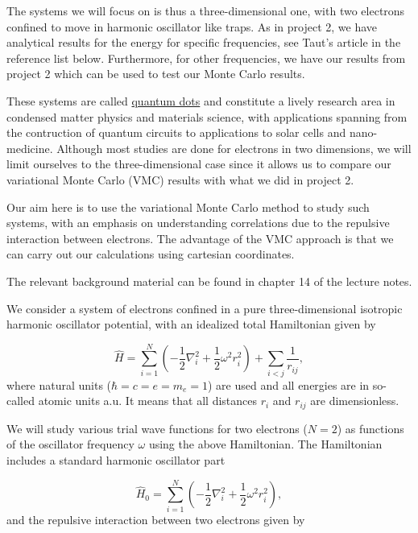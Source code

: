 \documentclass[%
oneside,                 %
final,                   %
10pt]{article}
\begin{document}
The systems we will focus on is thus  a three-dimensional one, with two electrons
confined to move in harmonic oscillator like traps. As in project 2, we have analytical
results for the energy for specific frequencies, see Taut's article in the reference list below.
Furthermore, for other frequencies, we have our results from project 2
which can be used to test our Monte Carlo results. 

These systems are called \href{{http://en.wikipedia.org/wiki/Quantum_dot}}{quantum dots} and constitute a lively research
area in condensed matter physics and materials science, with
applications spanning from the contruction of quantum circuits to
applications to solar cells and nano-medicine. Although most studies are done for electrons in two dimensions,
we will limit ourselves to the three-dimensional case since it allows us to compare our variational Monte Carlo (VMC)
results with what we did in project 2. 

Our aim here is to use the variational Monte Carlo method to study
such systems, with an emphasis on understanding correlations due to
the repulsive interaction between electrons.
The advantage of the VMC approach is that we can carry out our calculations using cartesian coordinates. 

The relevant background material can be found in chapter 14 of the lecture notes.


We consider a system of electrons confined in a pure three-dimensional
isotropic harmonic oscillator potential, with an idealized  total Hamiltonian given by

\begin{equation}
  \label{eq:finalH}
  \hat{H}=\sum_{i=1}^{N} \left(  -\frac{1}{2} \nabla_i^2 + \frac{1}{2} \omega^2r_i^2  \right)+\sum_{i<j}\frac{1}{r_{ij}},
\end{equation}
where natural units ($\hbar=c=e=m_e=1$) are used and all energies are
in so-called atomic units a.u. It means that all distances 
$r_i$ and $r_{ij}$ are dimensionless.


We will study various trial wave functions for  two electrons
($N=2$) as functions of the oscillator frequency $\omega$ using the above
Hamiltonian.  The Hamiltonian includes a standard harmonic oscillator
part

\begin{equation*}
\hat{H}_0=\sum_{i=1}^{N} \left(  -\frac{1}{2} \nabla_i^2 + \frac{1}{2} \omega^2r_i^2  \right),
\end{equation*}
and the repulsive interaction between two electrons given by
\end{document}
